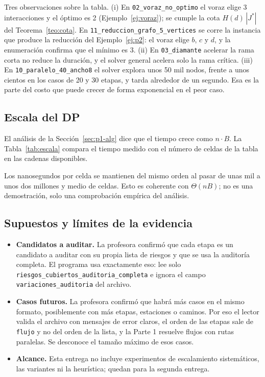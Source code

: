 \documentclass[11pt,a4paper]{article}
\theoremstyle{definition}
\begin{document}
Tres observaciones sobre la tabla. (i) En \texttt{02\_voraz\_no\_optimo} el voraz elige 3 interacciones y el óptimo es 2 (Ejemplo~\ref{ej:voraz}); se cumple la cota $H(d)\,|J^*|$ del Teorema~\ref{teo:cota}. En \texttt{11\_reduccion\_grafo\_5\_vertices} se corre la instancia que produce la reducción del Ejemplo~\ref{ej:p2}: el voraz elige $b$, $c$ y $d$, y la enumeración confirma que el mínimo es $3$. (ii) En \texttt{03\_diamante} acelerar la rama corta no reduce la duración, y el solver general acelera solo la rama crítica. (iii) En \texttt{10\_paralelo\_40\_ancho8} el solver explora unos 50 mil nodos, frente a unos cientos en los casos de 20 y 30 etapas, y tarda alrededor de un segundo. Esa es la parte del costo que puede crecer de forma exponencial en el peor caso.

\subsection{Escala del DP}

El análisis de la Sección~\ref{sec:p1-alg} dice que el tiempo crece como $n\cdot B$. La Tabla~\ref{tab:escala} compara el tiempo medido con el número de celdas de la tabla en las cadenas disponibles.

\begin{table}[ht]
\centering
\small
\TablaEscalaDP
\caption{Tiempo del DP frente al número de celdas $(n+1)(B+1)$.}
\label{tab:escala}
\end{table}

Los nanosegundos por celda se mantienen del mismo orden al pasar de unas mil a unos dos millones y medio de celdas. Esto es coherente con $\Theta(nB)$; no es una demostración, solo una comprobación empírica del análisis.

\subsection{Supuestos y límites de la evidencia}

\begin{itemize}[nosep]
  \item \textbf{Candidatos a auditar.} La profesora confirmó que cada etapa es un candidato a auditar con su propia lista de riesgos y que se usa la auditoría completa. El programa usa exactamente eso: lee solo \texttt{riesgos\_cubiertos\_auditoria\_completa} e ignora el campo \texttt{variaciones\_auditoria} del archivo.
  \item \textbf{Casos futuros.} La profesora confirmó que habrá más casos en el mismo formato, posiblemente con más etapas, estaciones o caminos. Por eso el lector valida el archivo con mensajes de error claros, el orden de las etapas sale de \texttt{flujo} y no del orden de la lista, y la Parte 1 resuelve flujos con rutas paralelas. Se desconoce el tamaño máximo de esos casos.
  \item \textbf{Alcance.} Esta entrega no incluye experimentos de escalamiento sistemáticos, las variantes ni la heurística; quedan para la segunda entrega.
\end{itemize}
\end{document}
